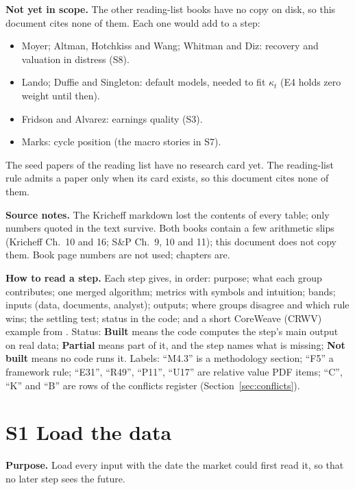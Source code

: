 \documentclass[11pt]{article}
\newcommand{\stbuilt}{\textcolor{good}{\textbf{Built}}}
\newcommand{\stpartial}{\textcolor{warn}{\textbf{Partial}}}
\newcommand{\stnot}{\textcolor{bad}{\textbf{Not built}}}
\begin{document}
\textbf{Not yet in scope.} The other reading-list books have no copy on disk, so this document cites none of them. Each one would add to a step:
\begin{itemize}
\item Moyer; Altman, Hotchkiss and Wang; Whitman and Diz: recovery and valuation in distress (S8).
\item Lando; Duffie and Singleton: default models, needed to fit $\kappa_t$ (E4 holds zero weight until then).
\item Fridson and Alvarez: earnings quality (S3).
\item Marks: cycle position (the macro stories in S7).
\end{itemize}
The seed papers of the reading list have no research card yet. The reading-list rule admits a paper only when its card exists, so this document cites none of them.

\textbf{Source notes.} The Kricheff markdown lost the contents of every table; only numbers quoted in the text survive. Both books contain a few arithmetic slips (Kricheff Ch.~10 and 16; S\&P Ch.~9, 10 and 11); this document does not copy them. Book page numbers are not used; chapters are.

\textbf{How to read a step.} Each step gives, in order: purpose; what each group contributes; one merged algorithm; metrics with symbols and intuition; bands; inputs (data, documents, analyst); outputs; where groups disagree and which rule wins; the settling test; status in the code; and a short CoreWeave (CRWV) example from . Status: \stbuilt{} means the code computes the step's main output on real data; \stpartial{} means part of it, and the step names what is missing; \stnot{} means no code runs it. Labels: ``M4.3'' is a methodology section; ``F5'' a framework rule; ``E31'', ``R49'', ``P11'', ``U17'' are relative value PDF items; ``C'', ``K'' and ``B'' are rows of the conflicts register (Section~\ref{sec:conflicts}).



\newpage
\tableofcontents
\newpage
\section{S1 Load the data}\label{s1}

\textbf{Purpose.} Load every input with the date the market could first read it, so that no later step sees the future.
\end{document}
